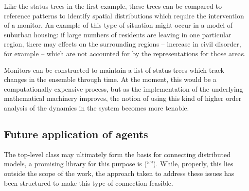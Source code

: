 Like the status trees in the first example, these trees can be
compared to reference patterns to identify spatial distributions which
require the intervention of a monitor.  An example of this type of
situation might occur in a model of suburban housing: if large numbers
of residents are leaving in one particular region, there may effects
on the surrounding regions -- increase in civil disorder, for example
-- which are not accounted for by the representations for those areas.

Monitors can be constructed to maintain a list of status trees which
track changes in the ensemble through time. At the moment, this would
be a computationally expensive process, but as the
implementation of the underlying mathematical machinery improves, the
notion of using this kind of higher order analysis of the dynamics in
the system becomes more tenable.





\subsection{Future application of  agents}\label{distributedmodels}

The top-level  class may ultimately form the
basis for connecting distributed models, a promising library for this
purpose is  (``''). While,
properly, this lies outside the scope of the work, the approach taken
to address these issues has been structured to make this type of
connection feasible.


